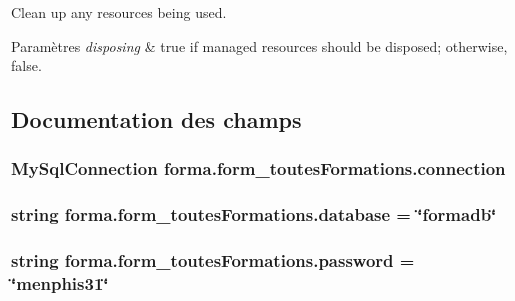 Clean up any resources being used. 


\begin{DoxyParams}{Paramètres}
{\em disposing} & true if managed resources should be disposed; otherwise, false.\\
\hline
\end{DoxyParams}


\subsection{Documentation des champs}
\subsubsection[{\texorpdfstring{connection}{connection}}]{\setlength{\rightskip}{0pt plus 5cm}My\+Sql\+Connection forma.\+form\+\_\+toutes\+Formations.\+connection}\hypertarget{classforma_1_1form__toutes_formations_a60b5bb6247f3b5c39578fd1c7ae94065}{}\label{classforma_1_1form__toutes_formations_a60b5bb6247f3b5c39578fd1c7ae94065}
\subsubsection[{\texorpdfstring{database}{database}}]{\setlength{\rightskip}{0pt plus 5cm}string forma.\+form\+\_\+toutes\+Formations.\+database = \char`\"{}formadb\char`\"{}}\hypertarget{classforma_1_1form__toutes_formations_a98d34a04cf5782072491ce875cd01902}{}\label{classforma_1_1form__toutes_formations_a98d34a04cf5782072491ce875cd01902}
\subsubsection[{\texorpdfstring{password}{password}}]{\setlength{\rightskip}{0pt plus 5cm}string forma.\+form\+\_\+toutes\+Formations.\+password = \char`\"{}menphis31\char`\"{}}\hypertarget{classforma_1_1form__toutes_formations_ade448b74ca6e712653ee666380c9e4b1}{}\label{classforma_1_1form__toutes_formations_ade448b74ca6e712653ee666380c9e4b1}

